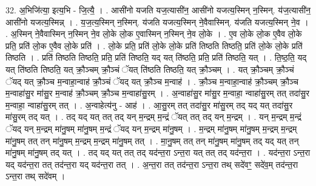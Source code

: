 \documentclass[17pt]{extarticle}
\begin{document}
32. अ॒भिजि॑त्या॒ इत्य॒भि - जि॒त्यै॒ । . आसी॑नो यजति यज॒त्यासी॑न॒ आसी॑नो यजत्य॒स्मिन् न॒स्मिन्. य॑ज॒त्यासी॑न॒ आसी॑नो यजत्य॒स्मिन्न् । . य॒ज॒त्य॒स्मिन् न॒स्मिन्. य॑जति यजत्य॒स्मिन् ने॒वैवास्मिन्. य॑जति यजत्य॒स्मिन् ने॒व । . अ॒स्मिन् ने॒वैवास्मिन् न॒स्मिन् ने॒व लो॒के लो॒क ए॒वास्मिन् न॒स्मिन् ने॒व लो॒के । . ए॒व लो॒के लो॒क ए॒वैव लो॒के प्रति॒ प्रति॑ लो॒क ए॒वैव लो॒के प्रति॑ । . लो॒के प्रति॒ प्रति॑ लो॒के लो॒के प्रति॑ तिष्ठति तिष्ठति॒ प्रति॑ लो॒के लो॒के प्रति॑ तिष्ठति । . प्रति॑ तिष्ठति तिष्ठति॒ प्रति॒ प्रति॑ तिष्ठति॒ यद् यत् ति॑ष्ठति॒ प्रति॒ प्रति॑ तिष्ठति॒ यत् । . ति॒ष्ठ॒ति॒ यद् यत् ति॑ष्ठति तिष्ठति॒ यत् क्रौ॒ञ्चम् क्रौ॒ञ्चं ॅयत् ति॑ष्ठति तिष्ठति॒ यत् क्रौ॒ञ्चम् । . यत् क्रौ॒ञ्चम् क्रौ॒ञ्चं ॅयद् यत् क्रौ॒ञ्च म॒न्वाहा॒न्वाह॑ क्रौ॒ञ्चं ॅयद् यत् क्रौ॒ञ्च म॒न्वाह॑ । . क्रौ॒ञ्च म॒न्वाहा॒न्वाह॑ क्रौ॒ञ्चम् क्रौ॒ञ्च म॒न्वाहा॑सु॒र मा॑सु॒र म॒न्वाह॑ क्रौ॒ञ्चम् क्रौ॒ञ्च म॒न्वाहा॑सु॒रम् । . अ॒न्वाहा॑सु॒र मा॑सु॒र म॒न्वाहा॒ न्वाहा॑सु॒रम् तत् तदा॑सु॒र म॒न्वाहा॒ न्वाहा॑सु॒रम् तत् । . अ॒न्वाहेत्य॑नु - आह॑ । . आ॒सु॒रम् तत् तदा॑सु॒र मा॑सु॒रम् तद् यद् यत् तदा॑सु॒र मा॑सु॒रम् तद् यत् । . तद् यद् यत् तत् तद् यन् म॒न्द्रम् म॒न्द्रं ॅयत् तत् तद् यन् म॒न्द्रम् । . यन् म॒न्द्रम् म॒न्द्रं ॅयद् यन् म॒न्द्रम् मा॑नु॒षम् मा॑नु॒षम् म॒न्द्रं ॅयद् यन् म॒न्द्रम् मा॑नु॒षम् । . म॒न्द्रम् मा॑नु॒षम् मा॑नु॒षम् म॒न्द्रम् म॒न्द्रम् मा॑नु॒षम् तत् तन् मा॑नु॒षम् म॒न्द्रम् म॒न्द्रम् मा॑नु॒षम् तत् । . मा॒नु॒षम् तत् तन् मा॑नु॒षम् मा॑नु॒षम् तद् यद् यत् तन् मा॑नु॒षम् मा॑नु॒षम् तद् यत् । . तद् यद् यत् तत् तद् यद॑न्त॒रा ऽन्त॒रा यत् तत् तद् यद॑न्त॒रा । . यद॑न्त॒रा ऽन्त॒रा यद् यद॑न्त॒रा तत् तद॑न्त॒रा यद् यद॑न्त॒रा तत् । . अ॒न्त॒रा तत् तद॑न्त॒रा ऽन्त॒रा तथ् सदे॑वꣳ॒॒ सदे॑व॒म् तद॑न्त॒रा ऽन्त॒रा तथ् सदे॑वम् । \newline
\end{document}
